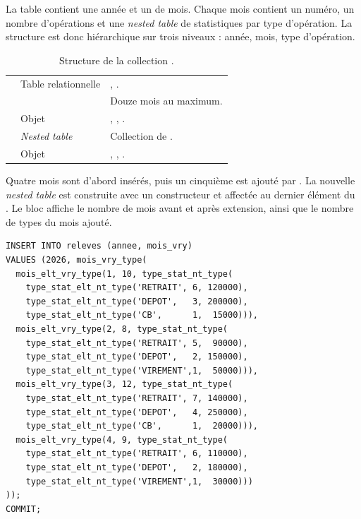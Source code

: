 La table  contient une année et un  de mois.
Chaque mois contient un numéro, un nombre d'opérations et une \emph{nested
table} de statistiques par type d'opération. La structure est donc
hiérarchique sur trois niveaux : année, mois, type d'opération.

\begin{table}[htbp]
  \centering
  \small
  \caption{Structure de la collection .}
  \label{tab:structure-releves}
  \begin{tabularx}{\textwidth}{@{}L{4.5cm}L{4.6cm}X@{}}
    \toprule
     &  &  \\
    \midrule
     & Table relationnelle &
    , . \\
     &  &
    Douze mois au maximum. \\
     & Objet &
    , , . \\
     & \emph{Nested table} &
    Collection de . \\
     & Objet &
    , , . \\
    \bottomrule
  \end{tabularx}
\end{table}

Quatre mois sont d'abord insérés, puis un cinquième est ajouté par
. La nouvelle \emph{nested table} est construite avec un
constructeur  et affectée au dernier élément
du . Le bloc affiche le nombre de mois avant et après extension,
ainsi que le nombre de types du mois ajouté.

\begin{lstlisting}[caption={E11 : insertion de quatre mois.},label={lst:e11-insert},basicstyle=\ttfamily\scriptsize]
INSERT INTO releves (annee, mois_vry)
VALUES (2026, mois_vry_type(
  mois_elt_vry_type(1, 10, type_stat_nt_type(
    type_stat_elt_nt_type('RETRAIT', 6, 120000),
    type_stat_elt_nt_type('DEPOT',   3, 200000),
    type_stat_elt_nt_type('CB',      1,  15000))),
  mois_elt_vry_type(2, 8, type_stat_nt_type(
    type_stat_elt_nt_type('RETRAIT', 5,  90000),
    type_stat_elt_nt_type('DEPOT',   2, 150000),
    type_stat_elt_nt_type('VIREMENT',1,  50000))),
  mois_elt_vry_type(3, 12, type_stat_nt_type(
    type_stat_elt_nt_type('RETRAIT', 7, 140000),
    type_stat_elt_nt_type('DEPOT',   4, 250000),
    type_stat_elt_nt_type('CB',      1,  20000))),
  mois_elt_vry_type(4, 9, type_stat_nt_type(
    type_stat_elt_nt_type('RETRAIT', 6, 110000),
    type_stat_elt_nt_type('DEPOT',   2, 180000),
    type_stat_elt_nt_type('VIREMENT',1,  30000)))
));
COMMIT;
\end{lstlisting}

